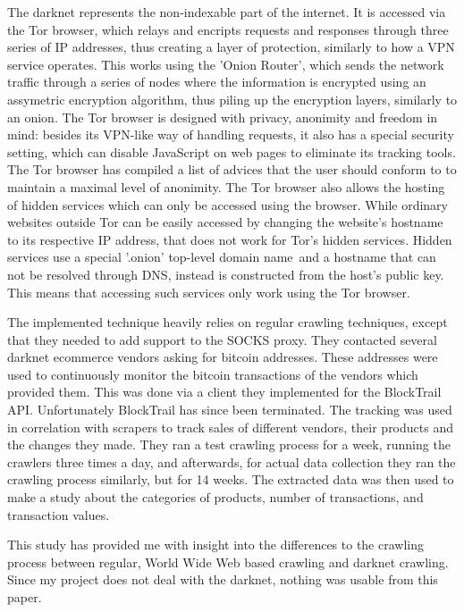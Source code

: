\documentclass[12pt,a4paper,twoside]{report}
\begin{document}
The darknet represents the non-indexable part of the internet. It is accessed via the Tor browser, which relays and encripts requests and responses through three series of IP addresses, thus creating a layer of protection, similarly to how a VPN service operates. This works using the 'Onion Router', which sends the network traffic through a series of nodes where the information is encrypted using an assymetric encryption algorithm, thus piling up the encryption layers, similarly to an onion. The Tor browser is designed with privacy, anonimity and freedom in mind: besides its VPN-like way of handling requests, it also has a special security setting, which can disable JavaScript on web pages to eliminate its tracking tools. The Tor browser has compiled a list of advices that the user should conform to to maintain a maximal level of anonimity. The Tor browser also allows the hosting of hidden services which can only be accessed using the browser. While ordinary websites outside Tor can be easily accessed by changing the website's hostname to its respective IP address, that does not work for Tor's hidden services. Hidden services use a special '.onion' top-level domain name and a hostname that can not be resolved through DNS, instead is constructed from the host's public key. This means that accessing such services only work using the Tor browser.

The implemented technique heavily relies on regular crawling techniques, except that they needed to add support to the SOCKS proxy. They contacted several darknet ecommerce vendors asking for bitcoin addresses. These addresses were used to continuously monitor the bitcoin transactions of the vendors which provided them. This was done via a client they implemented for the BlockTrail API. Unfortunately BlockTrail has since been terminated. The tracking was used in correlation with scrapers to track sales of different vendors, their products and the changes they made. They ran a test crawling process for a week, running the crawlers three times a day, and afterwards, for actual data collection they ran the crawling process similarly, but for 14 weeks. The extracted data was then used to make a study about the categories of products, number of transactions, and transaction values.

This study has provided me with insight into the differences to the crawling process between regular, World Wide Web based crawling and darknet crawling. Since my project does not deal with the darknet, nothing was usable from this paper.
\end{document}
